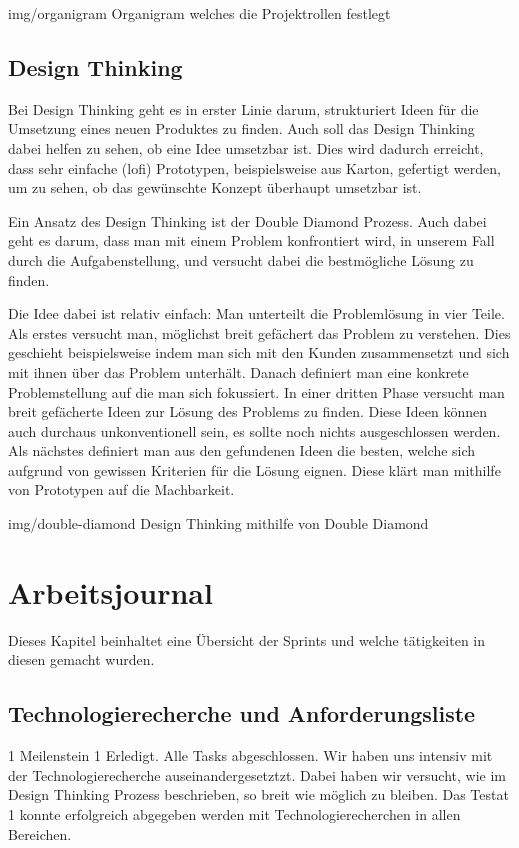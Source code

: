 \image
  {img/organigram}
  {Organigram welches die Projektrollen festlegt}

\subsection{Design Thinking}
\label{sec:design-thinking}

Bei Design Thinking \cite{Wikipedia-Design-Thinking} geht es in erster Linie darum, strukturiert 
Ideen für die Umsetzung eines neuen Produktes zu finden. Auch soll das Design Thinking
dabei helfen zu sehen, ob eine Idee umsetzbar ist. Dies wird dadurch erreicht,
dass sehr einfache (\acrshort{lofi}) Prototypen, beispielsweise aus Karton, 
gefertigt werden, um zu sehen, ob das gewünschte Konzept überhaupt umsetzbar ist.

Ein Ansatz des Design Thinking ist der Double Diamond Prozess. Auch dabei geht es
darum, dass man mit einem Problem konfrontiert wird, in unserem Fall durch die 
Aufgabenstellung, und versucht dabei die bestmögliche Lösung zu finden.

Die Idee dabei ist relativ einfach: Man unterteilt die Problemlösung in vier Teile.
Als erstes versucht man, möglichst breit gefächert das Problem zu verstehen. Dies geschieht
beispielsweise indem man sich mit den Kunden zusammensetzt und sich mit ihnen über das Problem unterhält.
Danach definiert man eine konkrete Problemstellung auf die man sich fokussiert.
In einer dritten Phase versucht man breit gefächerte Ideen zur Lösung des Problems zu finden.
Diese Ideen können auch durchaus unkonventionell sein, es sollte noch nichts ausgeschlossen werden.
Als nächstes definiert man aus den gefundenen Ideen
die besten, welche sich aufgrund von gewissen Kriterien für die Lösung eignen.
Diese klärt man mithilfe von Prototypen auf die Machbarkeit.

\image
  {img/double-diamond}
  {Design Thinking mithilfe von Double Diamond}

\section{Arbeitsjournal}

Dieses Kapitel beinhaltet eine Übersicht der Sprints und welche tätigkeiten 
in diesen gemacht wurden.

\subsection*{Technologierecherche und Anforderungsliste}
\workday
    {1}
    {\ok Meilenstein 1 Erledigt. Alle Tasks abgeschlossen.}
    {
      Wir haben uns intensiv mit der Technologierecherche auseinandergesetztzt.
      Dabei haben wir versucht, wie im Design Thinking Prozess beschrieben, so breit wie möglich
      zu bleiben.
    }
    {
      Das Testat 1 konnte erfolgreich abgegeben werden mit Technologierecherchen in
      allen Bereichen.
    }

